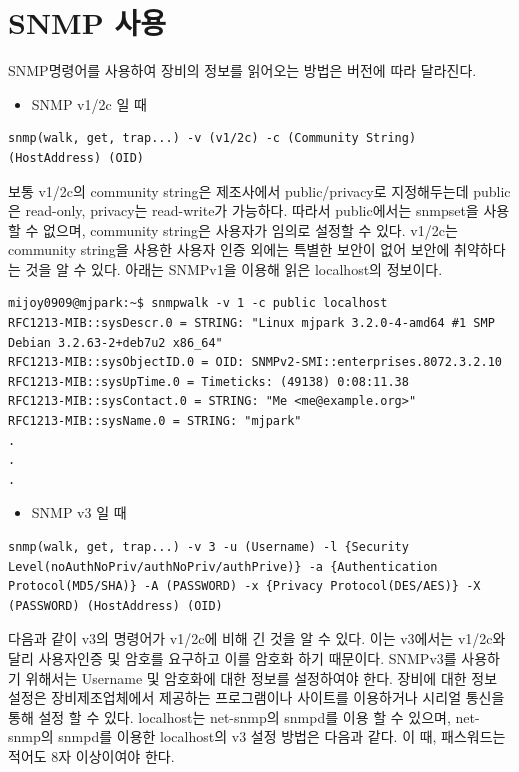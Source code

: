 \documentclass[11pt
  , a4paper
  , article
  , oneside
]{memoir}
\begin{document}
\section{SNMP 사용}
SNMP명령어를 사용하여 장비의 정보를 읽어오는 방법은 버전에 따라 달라진다.

\begin{itemize}
\item SNMP v1/2c 일 때
\end{itemize}

\begin{lstlisting}[style=termstyle]
snmp(walk, get, trap...) -v (v1/2c) -c (Community String) (HostAddress) (OID) 
\end{lstlisting}

보통 v1/2c의 community string은 제조사에서 public/privacy로 지정해두는데 public은 read-only, privacy는 read-write가 가능하다. 따라서 public에서는 snmpset을 사용할 수 없으며, community string은 사용자가 임의로 설정할 수 있다. v1/2c는 community string을 사용한 사용자 인증 외에는 특별한 보안이 없어 보안에 취약하다는 것을 알 수 있다. 아래는 SNMPv1을 이용해 읽은 localhost의 정보이다.
\begin{lstlisting}[style=termstyle]
mijoy0909@mjpark:~$ snmpwalk -v 1 -c public localhost
RFC1213-MIB::sysDescr.0 = STRING: "Linux mjpark 3.2.0-4-amd64 #1 SMP Debian 3.2.63-2+deb7u2 x86_64"
RFC1213-MIB::sysObjectID.0 = OID: SNMPv2-SMI::enterprises.8072.3.2.10
RFC1213-MIB::sysUpTime.0 = Timeticks: (49138) 0:08:11.38
RFC1213-MIB::sysContact.0 = STRING: "Me <me@example.org>"
RFC1213-MIB::sysName.0 = STRING: "mjpark"
.
.
.
\end{lstlisting}

\begin{itemize}
\item SNMP v3 일 때
\end{itemize}

\begin{lstlisting}[style=termstyle]
snmp(walk, get, trap...) -v 3 -u (Username) -l {Security Level(noAuthNoPriv/authNoPriv/authPrive)} -a {Authentication Protocol(MD5/SHA)} -A (PASSWORD) -x {Privacy Protocol(DES/AES)} -X (PASSWORD) (HostAddress) (OID) 
\end{lstlisting}

다음과 같이 v3의 명령어가 v1/2c에 비해 긴 것을 알 수 있다. 이는 v3에서는 v1/2c와 달리 사용자인증 및 암호를 요구하고 이를 암호화 하기 때문이다. 
SNMPv3를 사용하기 위해서는 Username 및 암호화에 대한 정보를 설정하여야 한다. 장비에 대한 정보 설정은 장비제조업체에서 제공하는 프로그램이나 사이트를 이용하거나 시리얼 통신을 통해 설정 할 수 있다. localhost는 net-snmp의 snmpd를 이용 할 수 있으며, net-snmp의 snmpd를 이용한 localhost의 v3 설정 방법은 다음과 같다. 이 때, 패스워드는 적어도 8자 이상이여야 한다.
\end{document}
